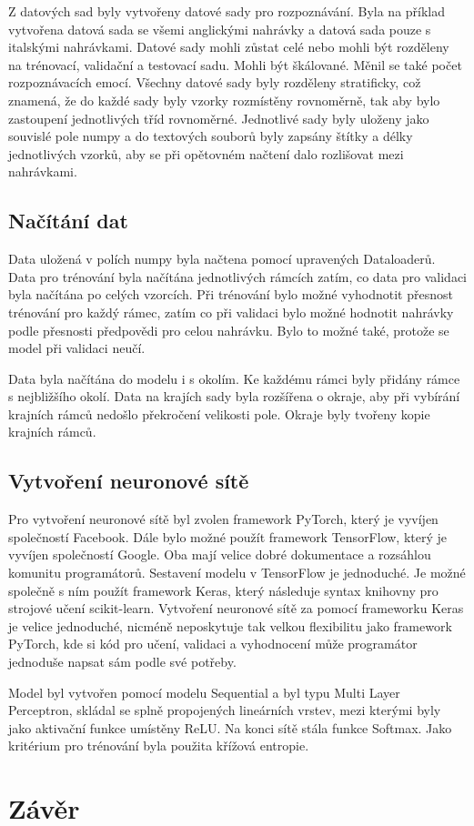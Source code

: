 \documentclass[FM,BP]{tulthesis}
\begin{document}
Z datových sad byly vytvořeny datové sady pro rozpoznávání. Byla na příklad vytvořena datová sada se všemi anglickými nahrávky a datová sada pouze s italskými nahrávkami. Datové sady mohli zůstat celé nebo mohli být rozděleny na trénovací, validační a testovací sadu. Mohli být škálované. Měnil se také počet rozpoznávacích emocí. Všechny datové sady byly rozděleny stratificky, což znamená, že do každé sady byly vzorky rozmístěny rovnoměrně, tak aby bylo zastoupení jednotlivých tříd rovnoměrné. Jednotlivé sady byly uloženy jako souvislé pole numpy a do textových souborů byly zapsány štítky a délky jednotlivých vzorků, aby se při opětovném načtení dalo rozlišovat mezi nahrávkami.

\section{Načítání dat}
Data uložená v polích numpy byla načtena pomocí upravených Dataloaderů. Data pro trénování byla načítána jednotlivých rámcích zatím, co data pro validaci byla načítána po celých vzorcích. Při trénování bylo možné vyhodnotit přesnost trénování pro každý rámec, zatím co při validaci bylo možné hodnotit nahrávky podle přesnosti předpovědi pro celou nahrávku. Bylo to možné také, protože se model při validaci neučí.

Data byla načítána do modelu i s okolím. Ke každému rámci byly přidány rámce s nejbližšího okolí. Data na krajích sady byla rozšířena o okraje, aby při vybírání krajních rámců nedošlo překročení velikosti pole. Okraje byly tvořeny kopie krajních rámců.

\section{Vytvoření neuronové sítě}
Pro vytvoření neuronové sítě byl zvolen framework PyTorch, který je vyvíjen společností Facebook. Dále bylo možné použít framework TensorFlow, který je vyvíjen společností Google. Oba mají velice dobré dokumentace a rozsáhlou komunitu programátorů. Sestavení modelu v TensorFlow je jednoduché. Je možné společně s ním použít framework Keras, který následuje syntax knihovny pro strojové učení scikit-learn. Vytvoření neuronové sítě za pomocí frameworku Keras je velice jednoduché, nicméně neposkytuje tak velkou flexibilitu jako framework PyTorch, kde si kód pro učení, validaci a vyhodnocení může programátor jednoduše napsat sám podle své potřeby. 

Model byl vytvořen pomocí modelu Sequential a byl typu Multi Layer Perceptron, skládal se splně propojených lineárních vrstev, mezi kterými byly jako aktivační funkce umístěny ReLU. Na konci sítě stála funkce Softmax. Jako kritérium pro trénování byla použita křížová entropie.

\chapter{Závěr}

\nocite{*}
\printbibliography[title={Použitá literatura}] %
\end{document}
